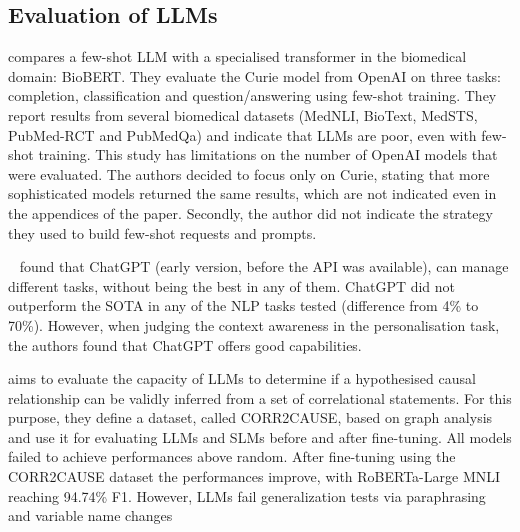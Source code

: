

\subsection{Evaluation of LLMs}
\cite{moradi2022gpt3} compares a few-shot LLM with a specialised transformer in the biomedical domain: BioBERT. They evaluate the Curie model from OpenAI on three tasks: completion, classification and question/answering using few-shot training. 
They report results from several biomedical datasets (MedNLI, BioText, MedSTS, PubMed-RCT and PubMedQa) and indicate that LLMs are poor, even with few-shot training. 
This study has limitations on the number of OpenAI models that were evaluated. The authors decided to focus only on Curie, stating that more sophisticated models returned the same results, which are not indicated even in the appendices of the paper. 
Secondly, the author did not indicate the strategy they used to build few-shot requests and prompts. 

~\cite{kokon2023chatgpt} found that ChatGPT (early version, before the API was available), can manage different tasks, without being the best in any of them. ChatGPT did not outperform the SOTA in any of the NLP tasks tested (difference from 4\% to 70\%).
However, when judging the context awareness in the personalisation task, the authors found that ChatGPT offers good capabilities. 

\cite{jin2023large} aims to evaluate the capacity of LLMs to determine if a hypothesised causal relationship can be validly inferred from a set of correlational statements. For this purpose, they define a dataset, called CORR2CAUSE, based on graph analysis and use it for evaluating LLMs and SLMs before and after fine-tuning. All models failed to achieve performances above random. After fine-tuning using the CORR2CAUSE dataset the performances improve, with RoBERTa-Large MNLI reaching 94.74\% F1. However, LLMs fail generalization tests via paraphrasing and variable name changes

